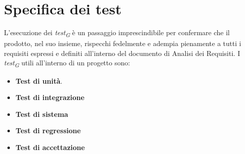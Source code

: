 \section{Specifica dei test}
L'esecuzione dei \textit{test}\textsubscript{\textit{G}} è un passaggio imprescindibile per confermare che il prodotto, nel suo insieme, rispecchi fedelmente e adempia pienamente a tutti i requisiti espressi e definiti all'interno del documento di Analisi dei Requisiti. I \textit{test}\textsubscript{\textit{G}} utili all'interno di un progetto sono:
\begin{itemize}
    \item \textbf{Test di unità}.
    \item \textbf{Test di integrazione}
    \item \textbf{Test di sistema}
    \item \textbf{Test di regressione}
    \item \textbf{Test di accettazione}
\end{itemize}





